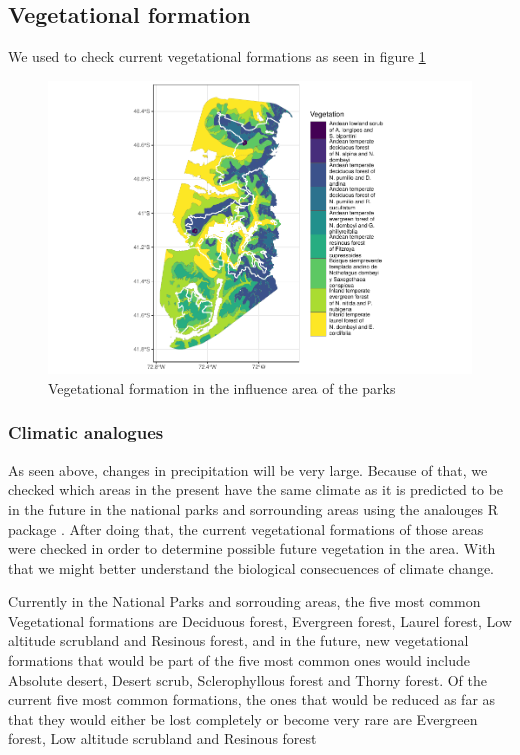 \documentclass[]{article}
\begin{document}
\hypertarget{vegetational-formation}{%
\subsection{Vegetational formation}\label{vegetational-formation}}

We used \citet{luebert2009depuracion} to check current vegetational formations as seen in figure \ref{fig:VegHull}

\begin{figure}
\centering
\includegraphics{Review_and_climate_files/figure-latex/VegHull-1.pdf}
\caption{\label{fig:VegHull}Vegetational formation in the influence area of the parks}
\end{figure}

\hypertarget{climatic-analogues}{%
\subsubsection{Climatic analogues}\label{climatic-analogues}}

As seen above, changes in precipitation will be very large. Because of that, we checked which areas in the present have the same climate as it is predicted to be in the future in the national parks and sorrounding areas using the analouges R package \citep{ramirez2011climate}. After doing that, the current vegetational formations of those areas were checked in order to determine possible future vegetation in the area. With that we might better understand the biological consecuences of climate change.

Currently in the National Parks and sorrouding areas, the five most common Vegetational formations are Deciduous forest, Evergreen forest, Laurel forest, Low altitude scrubland and Resinous forest, and in the future, new vegetational formations that would be part of the five most common ones would include Absolute desert, Desert scrub, Sclerophyllous forest and Thorny forest. Of the current five most common formations, the ones that would be reduced as far as that they would either be lost completely or become very rare are Evergreen forest, Low altitude scrubland and Resinous forest
\end{document}
